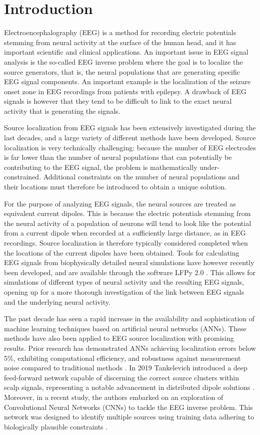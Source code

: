 \documentclass[a4paper, UKenglish, 11pt]{uiomaster}
\begin{document}
\section{Introduction}
Electroencephalography (EEG) is a method for recording electric potentials stemming from neural activity at the surface of the human head, and it has important scientific and clinical applications. An important issue in EEG signal analysis is the so-called EEG inverse problem where the goal is to localize the source generators, that is, the neural populations that are generating specific EEG signal components. An important example is the localization of the seizure onset zone in EEG recordings from patients with epilepsy. A drawback of EEG signals is however that they tend to be difficult to link to the exact neural activity that is generating the signals.

Source localization from EEG signals has been extensively investigated during the last decades, and a large variety of different methods have been developed. Source localization is very technically challenging: because the number of EEG electrodes is far lower than the number of neural populations that can potentially be contributing to the EEG signal, the problem is mathematically under-constrained. Additional constraints on the number of neural populations and their locations must therefore be introduced to obtain a unique solution.

For the purpose of analyzing EEG signals, the neural sources are treated as equivalent current dipoles. This is because the electric potentials stemming from the neural activity of a population of neurons will tend to look like the potential from a current dipole when recorded at a sufficiently large distance, as in EEG recordings. Source localization is therefore typically considered completed when the locations of the current dipoles have been obtained. Tools for calculating EEG signals from biophysically detailed neural simulations have however recently been developed, and are available through the software LFPy 2.0 \cite{LFPy}. This allows for simulations of different types of neural activity and the resulting EEG signals, opening up for a more thorough investigation of the link between EEG signals and the underlying neural activity.

The past decade has seen a rapid increase in the availability and sophistication of machine learning techniques based on artificial neural networks (ANNs). These methods have also been applied to EEG source localization with promising results. Prior research has demonstrated ANNs achieving localization errors below 5$\%$, exhibiting computational efficiency, and robustness against measurement noise compared to traditional methods \cite{van2000eeg}. In 2019 Tankelevich introduced a deep feed-forward network capable of discerning the correct source clusters within scalp signals, representing a notable advancement in distributed dipole solutions \cite{tankelevich2019inverse}. Moreover, in a recent study, the authors embarked on an exploration of Convolutional Neural Networks (CNNs) to tackle the EEG inverse problem. This network was designed to identify multiple sources using training data adhering to biologically plausible constraints \cite{hecker2021convdip}.
\end{document}
